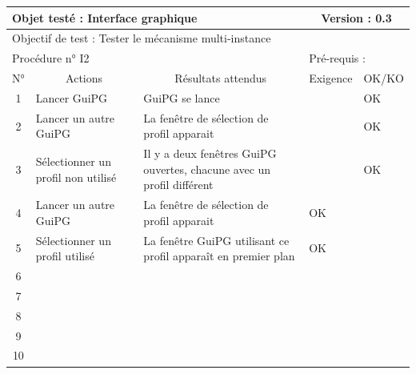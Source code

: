 \documentclass{../res/univ-projet}
\begin{document}
\begin{center}
    \begin{tabular}{|c|p{5cm}|p{5cm}|p{1.5cm}|p{1.5cm}|}
      \hline
      \multicolumn{3}{|l|}{Objet testé : Interface graphique} & \multicolumn{2}{c|}{Version : 0.3}\\ \hline
      \multicolumn{5}{|l|}{Objectif de test : Tester le mécanisme multi-instance}\\ \hline
      \multicolumn{3}{|l|}{Procédure n° I2} & \multicolumn{2}{p{3cm}|}{Pré-requis : }\\ \hline
      \multicolumn{1}{|c|}{N°} & \multicolumn{1}{c|}{Actions} & \multicolumn{1}{c|}{Résultats attendus} & 
      \multicolumn{1}{c|}{Exigence} & \multicolumn{1}{c|}{OK/KO}\\ \hline
      1 & Lancer GuiPG & GuiPG se lance &  & OK \\
      2 & Lancer un autre GuiPG & La fenêtre de sélection de profil apparait &  & OK \\
      3 & Sélectionner un profil non utilisé & Il y a deux fenêtres GuiPG ouvertes, chacune avec un profil différent &  & OK \\ 
      4 & Lancer un autre GuiPG & La fenêtre de sélection de profil apparait & OK & \\
      5 & Sélectionner un profil utilisé & La fenêtre GuiPG utilisant ce profil apparaît en premier plan & OK & \\
      6 &  &  &  & \\
      7 &  &  &  & \\
      8 &  &  &  & \\
      9 &  &  &  & \\
      10 &  &  &  &\\ 
  \hline
    \end{tabular}
    \vskip 2.2cm



\end{center}
\end{document}
